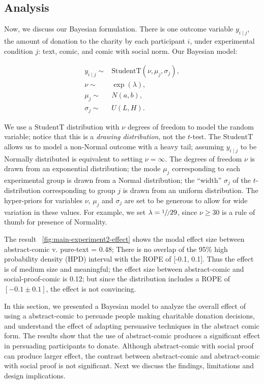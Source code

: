 \subsection{Analysis}
\label{sub:Study on Behavior Analysis}

Now, we discuss our Bayesian formulation. There is one outcome variable $y_{i \mid j}$, the amount of donation to the charity by each participant $i$, under experimental condition $j$: text, comic, and comic with social norm. Our Bayesian model:

\begin{align}
    y_{i \mid j} \sim &  \mathrm{StudentT}(\nu, \mu_j, \sigma_j), \\
    \nu \sim & \exp(\lambda), \\
    \mu_j \sim & N(a,b), \\
    \sigma_j \sim & U(L,H).
\end{align}

We use a $\mathrm{StudentT}$ distribution with $\nu$ degrees of freedom to model the random variable; notice that this is a \textit{drawing distribution}, not the $t$-test. The $\mathrm{StudentT}$ allows us to model a non-Normal outcome with a heavy tail; assuming $y_{i \mid j}$ to be Normally distributed is equivalent to setting $\nu=\infty$. The degrees of freedom $\nu$ is drawn from an exponential distribution; the mode $\mu_j$ corresponding to each experimental group is drawn from a Normal distribution; the ``width'' $\sigma_j$ of the $t$-distribution corresponding to group $j$ is drawn from an uniform distribution. The hyper-priors for variables $\nu$, $\mu_j$ and $\sigma_j$ are set to be generous to allow for wide variation in these values. For example, we set $\lambda=\sfrac{1}/{29}$, since $\nu \geq 30$ is a rule of thumb for presence of Normality.

The result ~\ref{fig:main-experiment2-effect} shows the modal effect size between abstract-comic v. pure-text = 0.48; There is no overlap of the 95\% high probability density (HPD) interval with the ROPE of [-0.1, 0.1]. Thus the effect is of medium size and meaningful; the effect size between abstract-comic and social-proof-comic is 0.12; but since the distribution includes a ROPE of $[-0.1 \pm 0.1]$, the effect is not convincing.

In this section, we presented a Bayesian model to analyze the overall effect of using a abstract-comic to persuade people making charitable donation decisions, and understand the effect of adapting persuasive techniques in the abstract comic form. The results show that the use of abstract-comic produces a significant effect in persuading participants to donate. Although abstract-comic with social proof can produce larger effect, the contrast between abstract-comic and abstract-comic with social proof is not significant. Next we discuss the findings, limitations and design implications.
